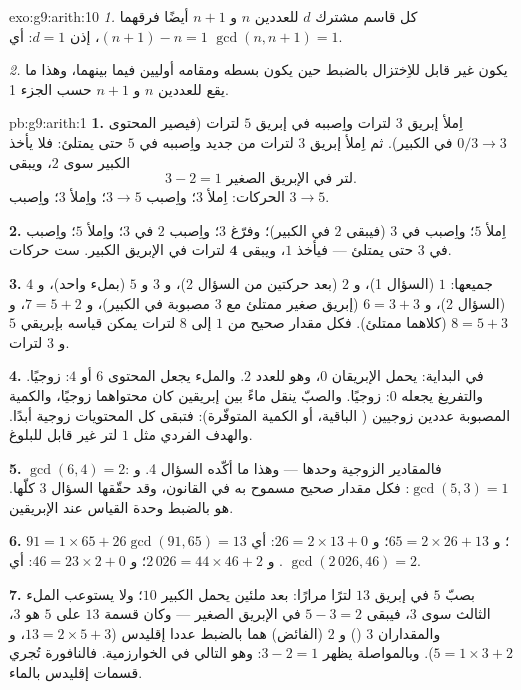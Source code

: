 \begin{solution}{exo:g9:arith:10}
\emph{1.} كل قاسم مشترك $d$ للعددين $n$ و $n+1$  أيضًا
فرقهما $(n+1) - n = 1$، إذن $d = 1$: أي $\gcd(n, n+1) = 1$.

\emph{2.} يكون  غير قابل للاِختزال بالضبط حين يكون بسطه
ومقامه أوليين فيما بينهما، وهذا ما يقع للعددين $n$ و $n + 1$
حسب الجزء 1.
\end{solution}

\begin{solution}{pb:g9:arith:1}
\textbf{1.} اِملأ إبريق $3$ لترات واِصببه في إبريق $5$ لترات
(فيصير المحتوى $0/3 \to 3$ في الكبير). ثم اِملأ إبريق $3$ لترات
من جديد واِصببه في $5$ حتى يمتلئ: فلا يأخذ الكبير سوى $2$، ويبقى
\[
3 - 2 = 1 \text{ لتر في الإبريق الصغير.}
\]
الحركات: اِملأ $3$؛ واِصبب $3 \to 5$؛ واِملأ $3$؛ واِصبب $3 \to 5$.

\textbf{2.} اِملأ $5$؛ واِصبب في $3$ (فيبقى $2$ في الكبير)؛ وفرّغ
$3$؛ واِصبب $2$ في $3$؛ واِملأ $5$؛ واِصبب في $3$ حتى يمتلئ ---
فيأخذ $1$، ويبقى $\mathbf{4}$ لترات في الإبريق الكبير. ست حركات.

\textbf{3.} جميعها: $1$ (السؤال 1)، و $2$ (بعد حركتين من السؤال
2)، و $3$ و $5$ (بملء واحد)، و $4$ (السؤال 2)، و $6 = 3 + 3$
(إبريق صغير ممتلئ مع $3$ مصبوبة في الكبير)، و $7 = 5 + 2$،
و $8 = 5 + 3$ (كلاهما ممتلئ). فكل مقدار صحيح من $1$ إلى $8$ لترات
يمكن قياسه بإبريقي $5$ و $3$ لترات.

\textbf{4.} في البداية: يحمل الإبريقان $0$، وهو  للعدد $2$.
والملء يجعل المحتوى $6$ أو $4$: زوجيًا. والتفريغ يجعله $0$:
زوجيًا. والصبّ ينقل ماءً بين إبريقين كان محتواهما
زوجيًا، والكمية المصبوبة  عددين زوجيين (
الباقية، أو الكمية المتوفّرة): فتبقى كل المحتويات زوجية أبدًا.
والهدف الفردي مثل $1$ لتر غير قابل للبلوغ.

\textbf{5.} $\gcd(6, 4) = 2$: فالمقادير الزوجية وحدها --- وهذا
ما أكّده السؤال 4. و $\gcd(5, 3) = 1$: فكل مقدار صحيح مسموح به في
القانون، وقد حقّقها السؤال 3 كلّها.  هو
بالضبط وحدة القياس عند الإبريقين.

\textbf{6.} $91 = 1 \times 65 + 26$؛ و $65 = 2 \times 26 + 13$؛
و $26 = 2 \times 13 + 0$: أي $\gcd(91, 65) = 13$. و
$2\,026 = 44 \times 46 + 2$؛ و $46 = 23 \times 2 + 0$: أي
$\gcd(2\,026, 46) = 2$.

\textbf{7.} بصبّ $5$ في إبريق $13$ لترًا مرارًا: بعد ملئين يحمل
الكبير $10$؛ ولا يستوعب الملء الثالث سوى $3$، فيبقى $5 - 3 = 2$
في الإبريق الصغير --- وكان  قسمة $13$ على $5$ هو $3$،
والمقداران $3$ () و $2$ (الفائض) هما بالضبط عددا إقليدس
($13 = 2 \times 5 + 3$، و $5 = 1 \times 3 + 2$). وبالمواصلة يظهر
$3 - 2 = 1$: وهو  التالي في الخوارزمية. فالنافورة تُجري
قسمات إقليدس بالماء.


\end{solution}
